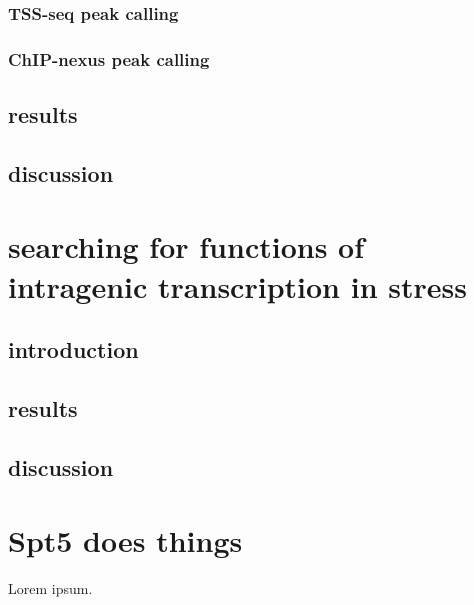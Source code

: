 \documentclass[11pt, a4paper]{article}
\begin{document}
\subsubsection{TSS-seq peak calling}

\subsubsection{ChIP-nexus peak calling}



\subsection{results}
\subsection{discussion}

\section{searching for functions of intragenic transcription in stress}
\subsection{introduction}
\subsection{results}
\subsection{discussion}

\section{Spt5 does things}

Lorem ipsum.

{}

\end{document}
